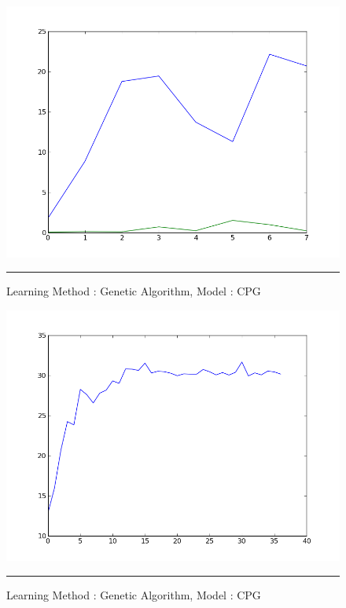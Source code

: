 \begin{figure}[htbp]
    \centering
    \includegraphics[scale=0.5]{Figures/cpg_simplex.png}
    \rule{35em}{0.5pt}
    \caption[Learning Method : GA, Model : CPG]{Learning Method : Genetic Algorithm, Model : CPG}
    \label{fig:cpg_gen}
\end{figure}


\begin{figure}[htbp]
    \centering
    \includegraphics[scale=0.5]{Figures/cpg_gen.png}
    \rule{35em}{0.5pt}
    \caption[Learning Method : GA, Model : CPG]{Learning Method : Genetic Algorithm, Model : CPG}
    \label{fig:cpg_gen}
\end{figure}

